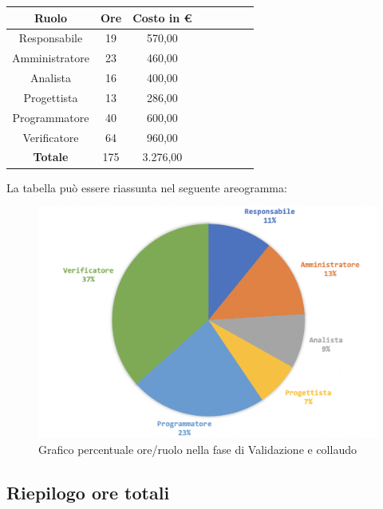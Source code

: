 		\begin{longtable}{|c|c|c|c|c|c|c|c}
			\hline
			\rowcolor{lighter-grayer}
			\textbf{Ruolo} & \textbf{Ore} & \textbf{Costo in € } \\
			\hline
			\endfirsthead
			
			\hline
			Responsabile 	    & 19 & 570,00\\
			\hline 
			\hline
			Amministratore	  & 23 & 460,00\\
			\hline
			\hline
			Analista 				& 16 & 400,00\\
			\hline
			\hline
			Progettista 		  & 13 & 286,00\\
			\hline
			\hline
			Programmatore 	 & 40 & 600,00\\
			\hline
			\hline
			Verificatore 		  & 64 & 960,00\\
			\hline
			\textbf{Totale} 	& 175 & 3.276,00\\
			\hline
			
		\end{longtable}
		\pagebreak
		
		La tabella può essere riassunta nel seguente areogramma:
		\begin{figure}[H]
			\centering
			\includegraphics[width=0.8\linewidth]{./images/validColl2.png}
			\caption{Grafico percentuale ore/ruolo nella fase di Validazione e collaudo}
			\label{fig:grafico costi ruolo fase Validazione e collaudo}
		\end{figure}
		
		\subsection{Riepilogo ore totali}
